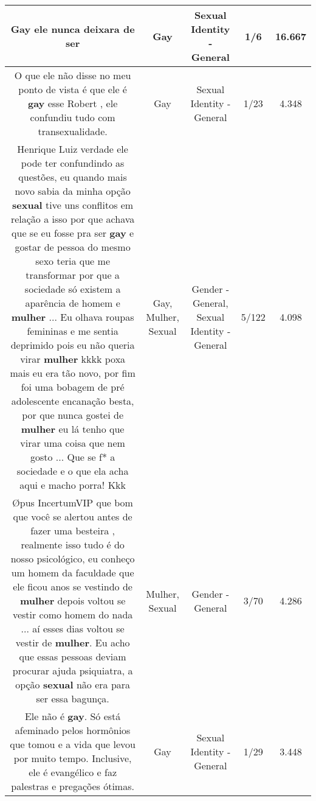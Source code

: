 \documentclass[11pt]{article}
\newlength\mylength
\begin{document}
\begin{center}
\begin{longtable}{|C{.65\mylength}|C{.30\mylength}|C{.12\mylength}|C{.12\mylength}|C{.12\mylength}|}
  \small Gay ele nunca deixara de ser\normalsize   & Gay & Sexual Identity - General & 1/6 & 16.667 \\  \hline
  \small O que ele não disse no meu ponto de vista é que ele é \textbf{gay} esse Robert , ele confundiu tudo com transexualidade.\normalsize   & Gay & Sexual Identity - General & 1/23 & 4.348 \\  \hline
  \small Henrique Luiz verdade ele pode ter confundindo as questões, eu quando mais novo sabia da minha opção \textbf{sexual} tive uns conflitos em relação a isso por que achava que se eu fosse pra ser \textbf{gay} e gostar de pessoa do mesmo sexo teria que me transformar por que a sociedade só existem a aparência de homem e \textbf{mulher} ... Eu olhava roupas femininas e me sentia deprimido pois eu não queria virar \textbf{mulher} kkkk poxa mais eu era tão novo, por fim foi uma bobagem de pré adolescente encanação besta, por que nunca gostei de \textbf{mulher} eu lá tenho que virar uma coisa que nem gosto ... Que se f* a sociedade e o que ela acha aqui e macho porra! Kkk\normalsize   & Gay, Mulher, Sexual & Gender - General, Sexual Identity - General & 5/122 & 4.098 \\  \hline
  \small Øpus IncertumVIP que bom que você se alertou antes de fazer uma besteira , realmente isso tudo é do nosso psicológico, eu conheço um homem da faculdade que ele ficou anos se vestindo de \textbf{mulher} depois voltou se vestir como homem do nada ... aí esses dias voltou se vestir de \textbf{mulher}. Eu acho que essas pessoas deviam procurar ajuda psiquiatra, a opção \textbf{sexual} não era para ser essa bagunça.\normalsize   & Mulher, Sexual & Gender - General & 3/70 & 4.286 \\  \hline
  \small Ele não é \textbf{gay}. Só está afeminado pelos hormônios que tomou e a vida que levou por muito tempo. Inclusive, ele é evangélico e faz palestras e pregações ótimas.\normalsize   & Gay & Sexual Identity - General & 1/29 & 3.448 \\  \hline

\end{longtable}
\end{center}
\end{document}
